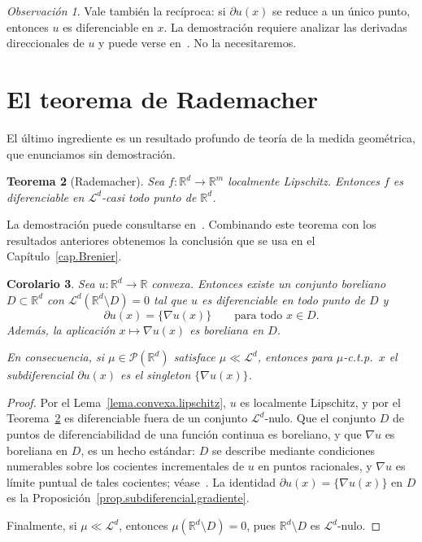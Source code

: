 \documentclass[12pt, a4paper]{amsbook}
\newcommand{\R}{{\mathbb R}}
\newtheorem{teo}{Teorema}[section]
\newtheorem{cor}[teo]{Corolario}
\theoremstyle{remark}
\newtheorem{obs}[teo]{Observación}
\theoremstyle{definition}
\numberwithin{section}{chapter}
\numberwithin{subsection}{section}
\numberwithin{equation}{section}
\numberwithin{figure}{chapter}
\begin{document}
\begin{obs}
Vale también la recíproca: si $\partial u(x)$ se reduce a un único punto,
entonces $u$ es diferenciable en $x$. La demostración requiere analizar las
derivadas direccionales de $u$ y puede verse en~\cite[Theorem~25.1]{Rockafellar1970}.
No la necesitaremos.
\end{obs}

\section{El teorema de Rademacher}

El último ingrediente es un resultado profundo de teoría de la medida
geométrica, que enunciamos sin demostración.

\begin{teo}[Rademacher]\label{teo.Rademacher}
Sea $f\colon\R^d\to\R^m$ localmente Lipschitz. Entonces $f$ es diferenciable
en $\mathcal L^d$-casi todo punto de $\R^d$.
\end{teo}

La demostración puede consultarse en~\cite[Theorem~3.2]{EvansGariepy}.
Combinando este teorema con los resultados anteriores obtenemos la
conclusión que se usa en el Capítulo~\ref{cap.Brenier}.

\begin{cor}\label{cor.convexa.ctp}
Sea $u\colon\R^d\to\R$ convexa. Entonces existe un conjunto boreliano
$D\subset\R^d$ con $\mathcal L^d(\R^d\setminus D)=0$ tal que $u$ es
diferenciable en todo punto de $D$ y
\[
\partial u(x)=\{\nabla u(x)\}
\qquad\text{para todo }x\in D.
\]
Además, la aplicación $x\mapsto\nabla u(x)$ es boreliana en $D$.

En consecuencia, si $\mu\in\mathcal P(\R^d)$ satisface $\mu\ll\mathcal L^d$,
entonces para $\mu$-c.t.p.\ $x$ el subdiferencial $\partial u(x)$ es el
singleton $\{\nabla u(x)\}$.
\end{cor}

\begin{proof}
Por el Lema~\ref{lema.convexa.lipschitz}, $u$ es localmente Lipschitz, y por
el Teorema~\ref{teo.Rademacher} es diferenciable fuera de un conjunto
$\mathcal L^d$-nulo. Que el conjunto $D$ de puntos de diferenciabilidad de
una función continua es boreliano, y que $\nabla u$ es boreliana en $D$, es un
hecho estándar: $D$ se describe mediante condiciones numerables sobre los
cocientes incrementales de $u$ en puntos racionales, y $\nabla u$ es límite
puntual de tales cocientes; véase~\cite[Section~3.1]{EvansGariepy}. La
identidad $\partial u(x)=\{\nabla u(x)\}$ en $D$ es la
Proposición~\ref{prop.subdiferencial.gradiente}.

Finalmente, si $\mu\ll\mathcal L^d$, entonces
$\mu(\R^d\setminus D)=0$, pues $\R^d\setminus D$ es $\mathcal L^d$-nulo.
\end{proof}
\end{document}
